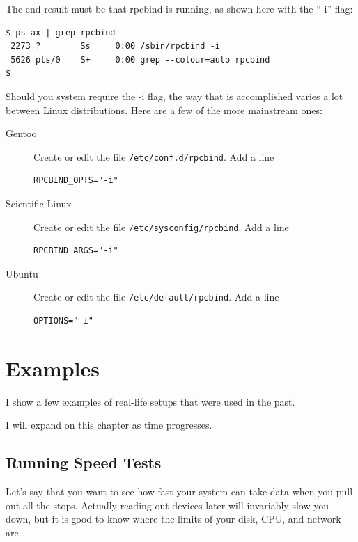 \documentclass{article}[11pt]
\begin{document}
The end result must be that rpcbind is running, as shown here with the
``-i'' flag:

\begin{verbatim} 
$ ps ax | grep rpcbind
 2273 ?        Ss     0:00 /sbin/rpcbind -i
 5626 pts/0    S+     0:00 grep --colour=auto rpcbind
$
\end{verbatim}

Should you system require the -i flag, the way that is accomplished varies
a lot between Linux distributions. Here are a few of the more
mainstream ones:

\begin{description}

\item[Gentoo]  Create or edit the file \verb|/etc/conf.d/rpcbind|. Add a line

\begin{verbatim} 
RPCBIND_OPTS="-i"  
\end{verbatim}

\item[Scientific Linux]  Create or edit the file \verb|/etc/sysconfig/rpcbind|. Add a line

\begin{verbatim} 
RPCBIND_ARGS="-i"  
\end{verbatim}

\item[Ubuntu]  Create or edit the file \verb|/etc/default/rpcbind|. Add a line

\begin{verbatim} 
OPTIONS="-i"  
\end{verbatim}

\end{description}



\appendix

\section{Examples}

I show a few examples of real-life setups that were used in the past.

I will expand on this chapter as time progresses.

\subsection{Running Speed Tests}
\label{speedtests}
Let's say that you want to see how fast your system can take data when
you pull out all the stops. Actually reading out devices later will
invariably slow you down, but it is good to know where the limits of
your disk, CPU, and network are.
\end{document}
